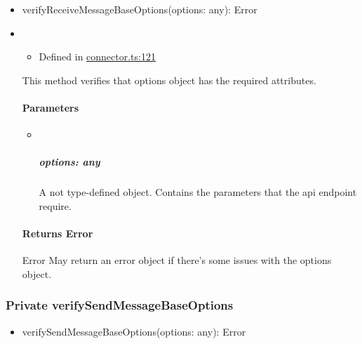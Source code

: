 \documentclass[]{article}
\providecommand{\tightlist}{%
  \setlength{\itemsep}{0pt}\setlength{\parskip}{0pt}}
\let\oldparagraph\paragraph
\renewcommand{\paragraph}[1]{\oldparagraph{#1}\mbox{}}
\let\oldsubparagraph\subparagraph
\renewcommand{\subparagraph}[1]{\oldsubparagraph{#1}\mbox{}}
\begin{document}
\begin{itemize}
\tightlist
\item
  verifyReceiveMessageBaseOptions{(}options{: }{any}{)}{: }{Error}
\end{itemize}

\begin{itemize}
\item
  \begin{itemize}
  \tightlist
  \item
    Defined in
    \href{https://github.com/BFMBFramework/TadoConnector/blob/f05932b/src/connector.ts\#L121}{connector.ts:121}
  \end{itemize}

  This method verifies that options object has the required attributes.

  \hypertarget{parameters-9}{%
  \paragraph{Parameters}\label{parameters-9}}

  \begin{itemize}
  \item ~
    \hypertarget{options-any-3}{%
    \subparagraph{\texorpdfstring{options:
    {any}}{options: any}}\label{options-any-3}}

    A not type-defined object. Contains the parameters that the api
    endpoint require.
  \end{itemize}

  \hypertarget{returns-error}{%
  \paragraph{\texorpdfstring{Returns
  {Error}}{Returns Error}}\label{returns-error}}

  Error May return an error object if there's some issues with the
  options object.
\end{itemize}

\protect\hypertarget{verifysendmessagebaseoptions}{}{}

\hypertarget{private-verifysendmessagebaseoptions}{%
\subsubsection{\texorpdfstring{{Private}
verifySendMessageBaseOptions}{Private verifySendMessageBaseOptions}}\label{private-verifysendmessagebaseoptions}}

\begin{itemize}
\tightlist
\item
  verifySendMessageBaseOptions{(}options{: }{any}{)}{: }{Error}
\end{itemize}
\end{document}

